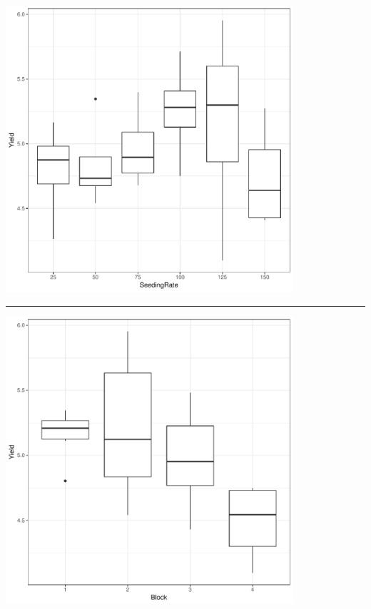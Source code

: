 \documentclass[a4paper, 10pt, fleqn, twosided]{memoir}
\begin{document}
\begin{tcolorbox}[title = Exercise 4 output]
\includegraphics[width=0.8\textwidth, frame]{Exercise4Var_boxplot.pdf}
\vspace{0.1cm}

{\color{outpt} {\hrule height 1pt}}

\vspace{0.1cm}


\includegraphics[width=0.8\textwidth, frame]{Exercise4Blk_boxplot.pdf}
\end{tcolorbox}
\end{document}
